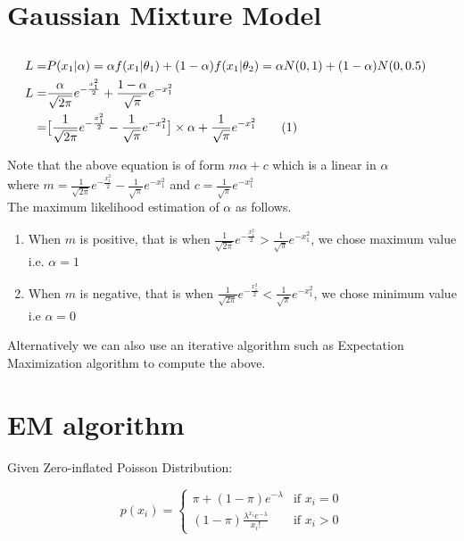\documentclass[a4paper,doc,notimes]{article}
\newcommand\numberthis{\addtocounter{equation}{1}\tag{\theequation}}
\begin{document}
\section{Gaussian Mixture Model}
\subsection{}

\begin{align*}
L = & P(x_1|\alpha) = \alpha f(x_1|\theta_1) + (1 - \alpha) f(x_1|\theta_2) = \alpha N(0, 1) + (1 - \alpha) N(0, 0.5)  & \\
L = & \frac{\alpha}{\sqrt{2 \pi}} e^{-\frac{x_1^2}{2}} + \frac{1 - \alpha}{\sqrt{\pi}} e^{-x_1^2} & \\
= & \big[\frac{1}{\sqrt{2 \pi}} e^{-\frac{x_1^2}{2}} - \frac{1}{\sqrt{\pi}} e^{-x_1^2} \big] \times \alpha + \frac{1}{\sqrt{\pi}} e^{-x_1^2} \numberthis \label{e:2a1} &  \\
\end{align*}

Note that the above equation is of form $m \alpha + c$ which is a linear in $\alpha$ \\ where $m = \frac{1}{\sqrt{2 \pi}} e^{-\frac{x_1^2}{2}} - \frac{1}{\sqrt{\pi}} e^{-x_1^2}$ and $c = \frac{1}{\sqrt{\pi}} e^{-x_1^2}$ \\
The maximum likelihood estimation of $\alpha$ as follows.
\begin{enumerate}
	\item When $m$ is positive, that is when $\frac{1}{\sqrt{2 \pi}} e^{-\frac{x_1^2}{2}} > \frac{1}{\sqrt{\pi}} e^{-x_1^2}$, we chose maximum value i.e. $\alpha=1$
	\item When $m$ is negative, that is when $\frac{1}{\sqrt{2 \pi}} e^{-\frac{x_1^2}{2}} < \frac{1}{\sqrt{\pi}} e^{-x_1^2}$, we chose minimum value i.e $\alpha=0$
\end{enumerate}

Alternatively we can also use an iterative algorithm such as Expectation Maximization algorithm to compute the above.

\section{EM algorithm}

Given Zero-inflated Poisson Distribution:

\begin{equation}\label{e:observed}
p(x_i) = \begin{cases}
\pi + (1-\pi) e^{-\lambda} & \text{if } x_i = 0\\
(1-\pi) \frac{\lambda^{x_i} e^{-\lambda}}{x_i!} &  \text{if } x_i > 0
\end{cases}
\end{equation}
\end{document}
